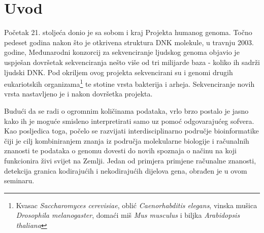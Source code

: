 \section*{Uvod}
\label{ch:intro}

Početak 21. stoljeća donio je sa sobom i kraj Projekta humanog genoma. Točno pedeset godina nakon što je otkrivena struktura DNK molekule\cite{Watson01}, u travnju 2003. godine, Međunarodni konzorcij za sekvenciranje ljudskog genoma objavio je uspješan dovršetak sekvenciranja nešto više od tri milijarde baza - koliko ih sadrži ljudski DNK. Pod okriljem ovog projekta sekvencirani su i genomi drugih eukariotskih organizama\footnote{Kvasac \textit{Saccharomyces cerevisiae}, oblić \textit{Caenorhabditis elegans}, vinska mušica \textit{Drosophila melanogaster}, domaći miš \textit{Mus musculus} i biljka \textit{Arabidopsis thaliana} } te stotine vrsta bakterija i arheja. Sekvenciranje novih vrsta nastavljeno je i nakon dovršetka projekta\cite{Cox01}. 
\par
Budući da se radi o ogromnim količinama podataka, vrlo brzo postalo je jasno kako ih je moguće smisleno interpretirati samo uz pomoć odgovarajućeg sofvera. Kao posljedica toga, počelo se razvijati interdisciplinarno područje bioinformatike čiji je cilj kombiniranjem znanja iz područja molekularne biologije i računalnih znanosti te podataka o genomu dovesti do novih spoznaja o načinu na koji funkcionira živi svijet na Zemlji. Jedan od primjera primjene računalne znanosti, detekcija granica kodirajućih i nekodirajućih dijelova gena, obrađen je u ovom seminaru.

